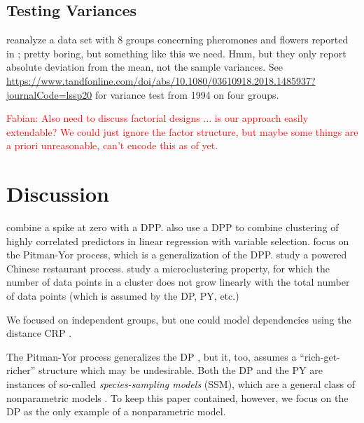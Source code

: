 \documentclass[11pt,a4paper]{article}
\theoremstyle{definition} %
\theoremstyle{case}
\newcommand{\FD}[1]{\textcolor{red}{Fabian: #1 }}
\begin{document}


\subsection{Testing Variances}
\textcite{boos2004comparing} reanalyze a data set with 8 groups concerning pheromones and flowers reported in \textcite{groot2005effect}; pretty boring, but something like this we need. Hmm, but they only report absolute deviation from the mean, not the sample variances. See \url{https://www.tandfonline.com/doi/abs/10.1080/03610918.2018.1485937?journalCode=lssp20} for variance test from 1994 on four groups.


\FD{Also need to discuss factorial designs ... is our approach easily extendable? We could just ignore the factor structure, but maybe some things are a priori unreasonable, can't encode this as of yet.}

\section{Discussion} \label{sec:discussion}
\textcite{kim2009spiked} combine a spike at zero with a DPP. \textcite{curtis2011bayesian} also use a DPP to combine clustering of highly correlated predictors in linear regression with variable selection. \textcite{canale2017pitman} focus on the Pitman-Yor process, which is a generalization of the DPP. \textcite{lu2018reducing} study a powered Chinese restaurant process. \textcite{miller2015microclustering} study a microclustering property, for which the number of data points in a cluster does not grow linearly with the total number of data points (which is assumed by the DP, PY, etc.)

We focused on independent groups, but one could model dependencies using the distance CRP \parencite{blei2011distance}.

The Pitman-Yor process generalizes the DP \parencite{pitman1997two}, but it, too, assumes a ``rich-get-richer'' structure which may be undesirable. Both the DP and the PY are instances of so-called \textit{species-sampling models} (SSM), which are a general class of nonparametric models \parencite[e.g.,][]{lee2013defining, ishwaran2003generalized, pitman1996some}. To keep this paper contained, however, we focus on the DP as the only example of a nonparametric model.
\end{document}
